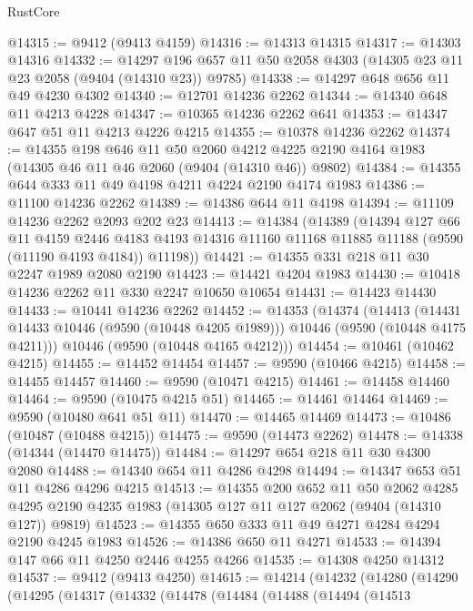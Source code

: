 \begin{lexlean}{RustCore}
\begin{coremodule}
@14315 := @9412 (@9413 @4159)
@14316 := @14313 @14315
@14317 := @14303 @14316
@14332 := @14297 @196 @657 @11 @50 @2058 @4303 (@14305 @23 @11 @23 @2058 (@9404 (@14310 @23)) @9785)
@14338 := @14297 @648 @656 @11 @49 @4230 @4302
@14340 := @12701 @14236 @2262
@14344 := @14340 @648 @11 @4213 @4228
@14347 := @10365 @14236 @2262 @641
@14353 := @14347 @647 @51 @11 @4213 @4226 @4215
@14355 := @10378 @14236 @2262
@14374 := @14355
    @198
    @646
    @11
    @50
    @2060
    @4212
    @4225
    @2190
    @4164
    @1983
    (@14305 @46 @11 @46 @2060 (@9404 (@14310 @46)) @9802)
@14384 := @14355 @644 @333 @11 @49 @4198 @4211 @4224 @2190 @4174 @1983
@14386 := @11100 @14236 @2262
@14389 := @14386 @644 @11 @4198
@14394 := @11109 @14236 @2262 @2093 @202 @23
@14413 := @14384
    (@14389
      (@14394
        @127
        @66
        @11
        @4159
        @2446
        @4183
        @4193
        @14316
        @11160
        @11168
        @11885
        @11188
        (@9590 (@11190 @4193 @4184))
        @11198))
@14421 := @14355 @331 @218 @11 @30 @2247 @1989 @2080 @2190
@14423 := @14421 @4204 @1983
@14430 := @10418 @14236 @2262 @11 @330 @2247 @10650 @10654
@14431 := @14423 @14430
@14433 := @10441 @14236 @2262
@14452 := @14353
    (@14374
      (@14413
        (@14431 @14433 @10446 (@9590 (@10448 @4205 @1989)))
        @10446
        (@9590 (@10448 @4175 @4211)))
      @10446
      (@9590 (@10448 @4165 @4212)))
@14454 := @10461 (@10462 @4215)
@14455 := @14452 @14454
@14457 := @9590 (@10466 @4215)
@14458 := @14455 @14457
@14460 := @9590 (@10471 @4215)
@14461 := @14458 @14460
@14464 := @9590 (@10475 @4215 @51)
@14465 := @14461 @14464
@14469 := @9590 (@10480 @641 @51 @11)
@14470 := @14465 @14469
@14473 := @10486 (@10487 (@10488 @4215))
@14475 := @9590 (@14473 @2262)
@14478 := @14338 (@14344 (@14470 @14475))
@14484 := @14297 @654 @218 @11 @30 @4300 @2080
@14488 := @14340 @654 @11 @4286 @4298
@14494 := @14347 @653 @51 @11 @4286 @4296 @4215
@14513 := @14355
    @200
    @652
    @11
    @50
    @2062
    @4285
    @4295
    @2190
    @4235
    @1983
    (@14305 @127 @11 @127 @2062 (@9404 (@14310 @127)) @9819)
@14523 := @14355 @650 @333 @11 @49 @4271 @4284 @4294 @2190 @4245 @1983
@14526 := @14386 @650 @11 @4271
@14533 := @14394 @147 @66 @11 @4250 @2446 @4255 @4266
@14535 := @14308 @4250 @14312
@14537 := @9412 (@9413 @4250)
@14615 := @14214
    (@14232
      (@14280
        (@14290
          (@14295
            (@14317
              (@14332
                (@14478
                  (@14484
                    (@14488
                      (@14494
                        (@14513

\end{coremodule}
\end{lexlean}
